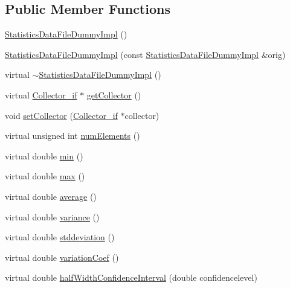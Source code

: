 \subsection*{Public Member Functions}
\begin{DoxyCompactItemize}
\item 
\hyperlink{class_statistics_data_file_dummy_impl_abcbb93f45cbfc16cc41b8e769532ef85}{Statistics\+Data\+File\+Dummy\+Impl} ()
\item 
\hyperlink{class_statistics_data_file_dummy_impl_aac6a71814e05b32acfd8c9ec5d78ffc8}{Statistics\+Data\+File\+Dummy\+Impl} (const \hyperlink{class_statistics_data_file_dummy_impl}{Statistics\+Data\+File\+Dummy\+Impl} \&orig)
\item 
virtual \hyperlink{class_statistics_data_file_dummy_impl_aeefca6aa2a461d221ef4da35ca86e536}{$\sim$\+Statistics\+Data\+File\+Dummy\+Impl} ()
\item 
virtual \hyperlink{class_collector__if}{Collector\+\_\+if} $\ast$ \hyperlink{class_statistics_data_file_dummy_impl_a918e9a2af69abdf66ed90fbacfd5d67d}{get\+Collector} ()
\item 
void \hyperlink{class_statistics_data_file_dummy_impl_a3d149d314ea88c3136754e0a4c182b49}{set\+Collector} (\hyperlink{class_collector__if}{Collector\+\_\+if} $\ast$collector)
\item 
virtual unsigned int \hyperlink{class_statistics_data_file_dummy_impl_a0931af6cd8a0852c5682fdbe6f6c5a77}{num\+Elements} ()
\item 
virtual double \hyperlink{class_statistics_data_file_dummy_impl_afb326f24142b0d2647cd2dc399555d89}{min} ()
\item 
virtual double \hyperlink{class_statistics_data_file_dummy_impl_a3b01b94c593e1a4bed17dc70b79d8f5b}{max} ()
\item 
virtual double \hyperlink{class_statistics_data_file_dummy_impl_a841db1f62ab7e20e5dbc7f943c4bd204}{average} ()
\item 
virtual double \hyperlink{class_statistics_data_file_dummy_impl_ae34ab679014e047ad22020dc6ed258e3}{variance} ()
\item 
virtual double \hyperlink{class_statistics_data_file_dummy_impl_a098b76d88a1ba4fdb07d29d8927c6c5b}{stddeviation} ()
\item 
virtual double \hyperlink{class_statistics_data_file_dummy_impl_a9efec5bc302c6fb09a67dde03f2b2ebc}{variation\+Coef} ()
\item 
virtual double \hyperlink{class_statistics_data_file_dummy_impl_a514b30f27707a031788b31b37e7d5cc6}{half\+Width\+Confidence\+Interval} (double confidencelevel)

\end{DoxyCompactItemize}
